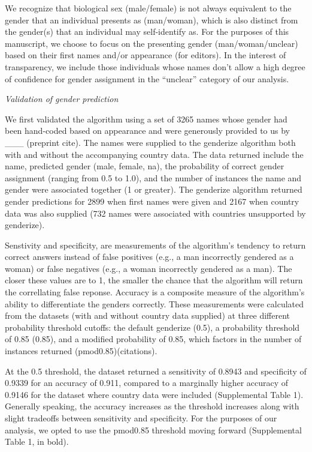 \documentclass[11pt,]{article}
\begin{document}
We recognize that biological sex (male/female) is not always equivalent
to the gender that an individual presents as (man/woman), which is also
distinct from the gender(s) that an individual may self-identify as. For
the purposes of this manuscript, we choose to focus on the presenting
gender (man/woman/unclear) based on their first names and/or appearance
(for editors). In the interest of transparency, we include those
individuals whose names don't allow a high degree of confidence for
gender assignment in the ``unclear'' category of our analysis.

\emph{Validation of gender prediction}

We first validated the algorithm using a set of 3265 names whose gender
had been hand-coded based on appearance and were generously provided to
us by \_\_\_ (preprint cite). The names were supplied to the genderize
algorithm both with and without the accompanying country data. The data
returned include the name, predicted gender (male, female, na), the
probability of correct gender assignment (ranging from 0.5 to 1.0), and
the number of instances the name and gender were associated together (1
or greater). The genderize algorithm returned gender predictions for
2899 when first names were given and 2167 when country data was also
supplied (732 names were associated with countries unsupported by
genderize).

Senstivity and specificity, are measurements of the algorithm's tendency
to return correct answers instead of false positives (e.g., a man
incorrectly gendered as a woman) or false negatives (e.g., a woman
incorrectly gendered as a man). The closer these values are to 1, the
smaller the chance that the algorithm will return the correllating false
reponse. Accuracy is a composite measure of the algorithm's ability to
differentiate the genders correctly. These measurements were calculated
from the datasets (with and without country data supplied) at three
different probability threshold cutoffs: the default genderize (0.5), a
probability threshold of 0.85 (0.85), and a modified probability of
0.85, which factors in the number of instances returned
(pmod0.85)(citations).

At the 0.5 threshold, the dataset returned a sensitivity of 0.8943 and
specificity of 0.9339 for an accuracy of 0.911, compared to a marginally
higher accuracy of 0.9146 for the dataset where country data were
included (Supplemental Table 1). Generally speaking, the accuracy
increases as the threshold increases along with slight tradeoffs between
sensitivity and specificity. For the purposes of our analysis, we opted
to use the pmod0.85 threshold moving forward (Supplemental Table 1, in
bold).
\end{document}
